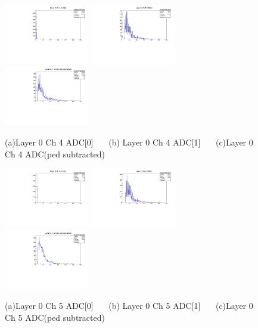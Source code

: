 \documentclass[a4paper,11pt]{article}
\theoremstyle{mytheor}
\begin{document}
\begin{figure}[H] 
\vspace*{-0.3cm} 
\includegraphics[width=0.33\textwidth,scale=0.5,trim=0 0 0 0,clip]{plotsdir/file0_muons-Layer0_Ch4_adc0-1.pdf} 
\includegraphics[width=0.33\textwidth,scale=0.5,trim=0 0 0 0,clip]{plotsdir/file0_muons-Layer0_Ch4_adc1-1.pdf} 
\includegraphics[width=0.33\textwidth,scale=0.5,trim=0 0 0 0,clip]{plotsdir/file0_muons-Layer0_Ch4_adcPedsub-1.pdf} 
\caption{(a)Layer 0 Ch 4 ADC[0] ~~~(b) Layer 0 Ch 4 ADC[1] ~~~(c)Layer 0 Ch 4 ADC(ped subtracted) } 
\end{figure} 
\begin{figure}[H] 
\vspace*{-0.3cm} 
\includegraphics[width=0.33\textwidth,scale=0.5,trim=0 0 0 0,clip]{plotsdir/file0_muons-Layer0_Ch5_adc0-1.pdf} 
\includegraphics[width=0.33\textwidth,scale=0.5,trim=0 0 0 0,clip]{plotsdir/file0_muons-Layer0_Ch5_adc1-1.pdf} 
\includegraphics[width=0.33\textwidth,scale=0.5,trim=0 0 0 0,clip]{plotsdir/file0_muons-Layer0_Ch5_adcPedsub-1.pdf} 
\caption{(a)Layer 0 Ch 5 ADC[0] ~~~(b) Layer 0 Ch 5 ADC[1] ~~~(c)Layer 0 Ch 5 ADC(ped subtracted) } 
\end{figure} 
\end{document}
